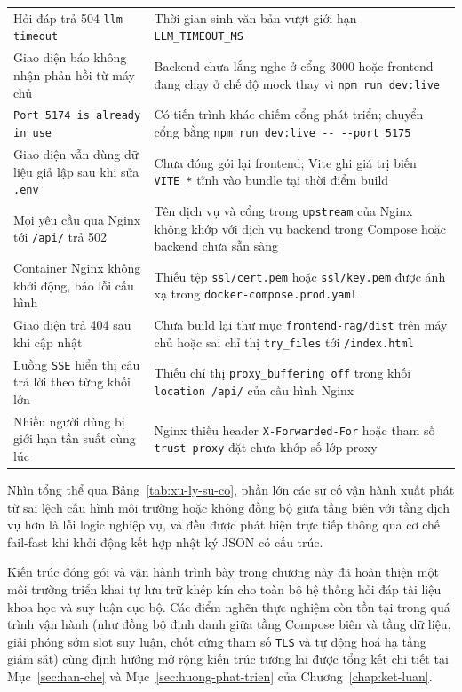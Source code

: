 \begin{longtable}{@{}>{\raggedright\arraybackslash}p{0.46\dimexpr\linewidth-2\tabcolsep\relax}>{\raggedright\arraybackslash}p{0.54\dimexpr\linewidth-2\tabcolsep\relax}@{}}
Hỏi đáp trả 504 \texttt{llm timeout} & Thời gian sinh văn bản vượt giới hạn \texttt{LLM\_\allowbreak{}TIMEOUT\_\allowbreak{}MS} \\
Giao diện báo không nhận phản hồi từ máy chủ & Backend chưa lắng nghe ở cổng 3000 hoặc frontend đang chạy ở chế độ mock thay vì \texttt{npm run dev:\allowbreak{}live} \\
\texttt{Port 5174 is already in use} & Có tiến trình khác chiếm cổng phát triển; chuyển cổng bằng \texttt{npm run dev:\allowbreak{}live -\allowbreak{}-\allowbreak{} -\allowbreak{}-\allowbreak{}port 5175} \\
Giao diện vẫn dùng dữ liệu giả lập sau khi sửa \texttt{.\allowbreak{}env} & Chưa đóng gói lại frontend; Vite ghi giá trị biến \texttt{VITE\_\allowbreak{}*} tĩnh vào bundle tại thời điểm build \\
Mọi yêu cầu qua Nginx tới \texttt{/\allowbreak{}api/\allowbreak{}} trả 502 & Tên dịch vụ và cổng trong \texttt{upstream} của Nginx không khớp với dịch vụ backend trong Compose hoặc backend chưa sẵn sàng \\
Container Nginx không khởi động, báo lỗi cấu hình & Thiếu tệp \texttt{ssl/\allowbreak{}cert.\allowbreak{}pem} hoặc \texttt{ssl/\allowbreak{}key.\allowbreak{}pem} được ánh xạ trong \texttt{docker-\allowbreak{}compose.\allowbreak{}prod.\allowbreak{}yaml} \\
Giao diện trả 404 sau khi cập nhật & Chưa build lại thư mục \texttt{frontend-\allowbreak{}rag/\allowbreak{}dist} trên máy chủ hoặc sai chỉ thị \texttt{try\_\allowbreak{}files} tới \texttt{/\allowbreak{}index.\allowbreak{}html} \\
Luồng \texttt{SSE} hiển thị câu trả lời theo từng khối lớn & Thiếu chỉ thị \texttt{proxy\_\allowbreak{}buffering off} trong khối \texttt{location /\allowbreak{}api/\allowbreak{}} của cấu hình Nginx \\
Nhiều người dùng bị giới hạn tần suất cùng lúc & Nginx thiếu header \texttt{X-\allowbreak{}Forwarded-\allowbreak{}For} hoặc tham số \texttt{trust proxy} đặt chưa khớp số lớp proxy \\
\bottomrule
\end{longtable}
\endgroup

Nhìn tổng thể qua Bảng~\ref{tab:xu-ly-su-co}, phần lớn các sự cố vận hành xuất phát từ sai lệch cấu hình môi trường hoặc không đồng bộ giữa tầng biên với tầng dịch vụ hơn là lỗi logic nghiệp vụ, và đều được phát hiện trực tiếp thông qua cơ chế fail-fast khi khởi động kết hợp nhật ký JSON có cấu trúc.

Kiến trúc đóng gói và vận hành trình bày trong chương này đã hoàn thiện một môi trường triển khai tự lưu trữ khép kín cho toàn bộ hệ thống hỏi đáp tài liệu khoa học và suy luận cục bộ. Các điểm nghẽn thực nghiệm còn tồn tại trong quá trình vận hành (như đồng bộ định danh giữa tầng Compose biên và tầng dữ liệu, giải phóng sớm slot suy luận, chốt cứng tham số \texttt{TLS} và tự động hoá hạ tầng giám sát) cùng định hướng mở rộng kiến trúc tương lai được tổng kết chi tiết tại Mục~\ref{sec:han-che} và Mục~\ref{sec:huong-phat-trien} của Chương~\ref{chap:ket-luan}.
